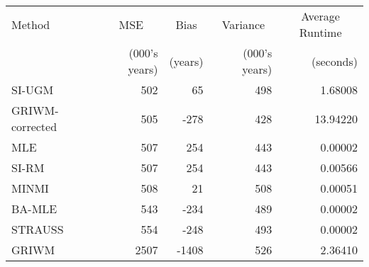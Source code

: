 
\begin{tabular}{lrrrr}
\toprule
\multicolumn{1}{l}{Method} & \multicolumn{1}{c}{MSE} & \multicolumn{1}{c}{Bias} & \multicolumn{1}{c}{Variance} & \multicolumn{1}{c}{Average Runtime} \\
 & (000's years) & (years) & (000's years) & (seconds)\\
\midrule
SI-UGM & 502 & 65 & 498 & 1.68008\\
GRIWM-corrected & 505 & -278 & 428 & 13.94220\\
MLE & 507 & 254 & 443 & 0.00002\\
SI-RM & 507 & 254 & 443 & 0.00566\\
MINMI & 508 & 21 & 508 & 0.00051\\
\addlinespace
BA-MLE & 543 & -234 & 489 & 0.00002\\
STRAUSS & 554 & -248 & 493 & 0.00002\\
GRIWM & 2507 & -1408 & 526 & 2.36410\\
\bottomrule
\end{tabular}

